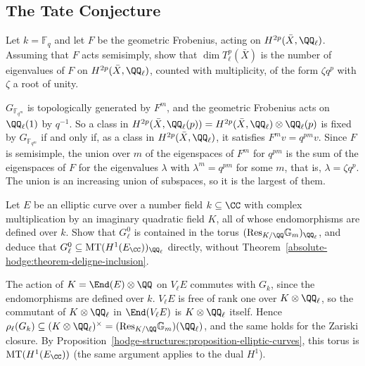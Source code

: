 \subsection{The Tate Conjecture}\label{absolute-hodge:subsection-exercises-tate-conjecture}

\begin{exercise}\label{absolute-hodge:exercise-frobenius}
Let $k = \mathbb{F}_q$ and let $F$ be the geometric Frobenius, acting on $H^{2p}(\bar X, \QQ_\ell)$. Assuming that $F$ acts semisimply, show that $\dim T^p_\ell(\bar X)$ is the number of eigenvalues of $F$ on
$H^{2p}(\bar X, \QQ_\ell)$, counted with multiplicity, of the form $\zeta q^p$ with $\zeta$ a root of unity.
\end{exercise}

\begin{solution}
$G_{\mathbb{F}_{q^m}}$ is topologically generated by $F^m$, and the geometric Frobenius acts on $\QQ_\ell(1)$ by $q^{-1}$. So a class in $H^{2p}(\bar X, \QQ_\ell(p)) = H^{2p}(\bar X, \QQ_\ell) \otimes \QQ_\ell(p)$ is fixed by
$G_{\mathbb{F}_{q^m}}$ if and only if, as a class in $H^{2p}(\bar X, \QQ_\ell)$, it satisfies $F^mv = q^{pm}v$. Since $F$ is semisimple, the union over $m$ of the eigenspaces of $F^m$ for $q^{pm}$ is the sum of the
eigenspaces of $F$ for the eigenvalues $\lambda$ with $\lambda^m = q^{pm}$ for some $m$, that is, $\lambda = \zeta q^p$. The union is an increasing union of subspaces, so it is the largest of them.
\end{solution}

\begin{exercise}\label{absolute-hodge:exercise-elliptic-mt}
Let $E$ be an elliptic curve over a number field $k \subseteq \CC$ with complex multiplication by an imaginary quadratic field $K$, all of whose endomorphisms are defined over $k$. Show that $G_\ell^0$ is contained in the
torus $(\mathrm{Res}_{K/\QQ}\mathbb{G}_m)_{\QQ_\ell}$, and deduce that $G_\ell^0 \subseteq \mathrm{MT}(H^1(E_\CC))_{\QQ_\ell}$ directly, without Theorem~\ref{absolute-hodge:theorem-deligne-inclusion}.
\end{exercise}

\begin{solution}
The action of $K = \End(E) \otimes \QQ$ on $V_\ell E$ commutes with $G_k$, since the endomorphisms are defined over $k$. $V_\ell E$ is free of rank one over $K \otimes \QQ_\ell$, so the commutant of $K \otimes \QQ_\ell$
in $\End(V_\ell E)$ is $K \otimes \QQ_\ell$ itself. Hence $\rho_\ell(G_k) \subseteq (K \otimes \QQ_\ell)^\times = (\mathrm{Res}_{K/\QQ}\mathbb{G}_m)(\QQ_\ell)$, and the same holds for the Zariski closure. By
Proposition~\ref{hodge-structures:proposition-elliptic-curves}, this torus is $\mathrm{MT}(H^1(E_\CC))$ (the same argument applies to the dual $H^1$).
\end{solution}

